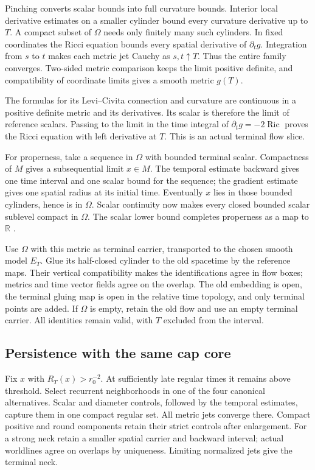 Pinching converts scalar bounds into full curvature bounds. Interior
local derivative estimates on a smaller cylinder bound every curvature
derivative up to $T$. A compact subset of $\Omega$ needs only finitely
many such cylinders. In fixed coordinates the Ricci equation bounds every
spatial derivative of $\partial_tg$. Integration from $s$ to $t$ makes
each metric jet Cauchy as $s,t\uparrow T$. Thus the entire family
converges. Two-sided metric comparison keeps the limit positive definite,
and compatibility of coordinate limits gives a smooth metric $g(T)$.

The formulas for its Levi--Civita connection and curvature are continuous
in a positive definite metric and its derivatives. Its scalar is therefore
the limit of reference scalars. Passing to the limit in the time integral
of $\partial_tg=-2\operatorname{Ric}$ proves the Ricci equation with
left derivative at $T$. This is an actual terminal flow slice.

For properness, take a sequence in $\Omega$ with bounded terminal scalar.
Compactness of $M$ gives a subsequential limit $x\in M$. The temporal
estimate backward gives one time interval and one scalar bound for the
sequence; the gradient estimate gives one spatial radius at its initial
time. Eventually $x$ lies in those bounded cylinders, hence is in
$\Omega$. Scalar continuity now makes every closed bounded scalar
sublevel compact in $\Omega$. The scalar lower bound completes properness
as a map to $\mathbb R$ \cite[Lemma 11.21, pp. 280--281]{MT2007}.

Use $\Omega$ with this metric as terminal carrier, transported to the
chosen smooth model $E_T$. Glue its half-closed cylinder to the old
spacetime by the reference maps. Their vertical compatibility makes the
identifications agree in flow boxes; metrics and time vector fields agree
on the overlap. The old embedding is open, the terminal gluing map is open
in the relative time topology, and only terminal points are added.
If $\Omega$ is empty, retain the old flow and use an empty terminal
carrier. All identities remain valid, with $T$ excluded from the interval.

\subsection{Persistence with the same cap core}

Fix $x$ with $R_T(x)>r_0^{-2}$. At sufficiently late regular times it
remains above threshold. Select recurrent neighborhoods in one of the
four canonical alternatives. Scalar and diameter controls, followed by
the temporal estimates, capture them in one compact regular set. All
metric jets converge there. Compact positive and round components retain
their strict controls after enlargement. For a strong neck retain a
smaller spatial carrier and backward interval; actual worldlines agree on
overlaps by uniqueness. Limiting normalized jets give the terminal neck.

